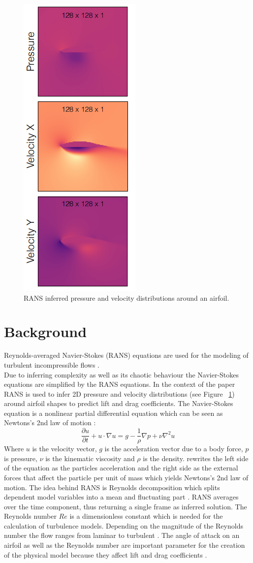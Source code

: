 \documentclass[acmtog]{techreportacmart}
\begin{document}
\begin{figure}[h]
  \includegraphics[width=.2\textwidth, height=.2\textheight]{figures/sampleTarget}
  \caption{RANS inferred pressure and velocity distributions around an airfoil.}
  \label{fig:zero}
\end{figure}

\section{Background}
Reynolds-averaged Navier-Stokes (RANS) equations are used for the modeling of turbulent incompressible flows \cite{Alfonsi}. \\
Due to inferring complexity as well as its chaotic behaviour the Navier-Stokes equations are simplified by the RANS equations.
In the context of the paper RANS is used to infer 2D pressure and velocity distributions (see Figure ~\ref{fig:zero}) around airfoil shapes to predict
lift and drag coefficients.
The Navier-Stokes equation is a nonlinear partial differential equation which can be seen as Newtons's 2nd law of motion \cite{BISTAFA2018}:
\begin{equation}
\label{eqn:01}
\frac{\partial{u}}{\partial{t}} + u \cdot \nabla u = g - \frac{1}{\rho} \nabla p + \nu \nabla^{2}u
\end{equation}
Where $u$ is the velocity vector, $g$ is the acceleration vector due to a body force, $p$ is pressure, 
$\nu$ is the kinematic viscosity and $\rho$ is the density. \cite{BISTAFA2018} rewrites the left side 
of the equation as the particles acceleration and the right side as the external forces that affect 
the particle per unit of mass which yields Newtons's 2nd law of motion.
The idea behind RANS is Reynolds decomposition which splits dependent model variables into a mean and fluctuating part \cite{Alfonsi}.
RANS averages over the time component, thus returning a single frame as inferred solution.
The Reynolds number $Re$ is a dimensionless constant which is needed for the calculation of turbulence 
models. Depending on the magnitude of the Reynolds number the flow ranges from laminar to turbulent 
\cite{lissaman1983}. The angle of attack on an airfoil as well as the Reynolds number are important 
parameter for the creation of the physical model because they affect lift and drag coefficients \cite{lissaman1983}. 
\end{document}
